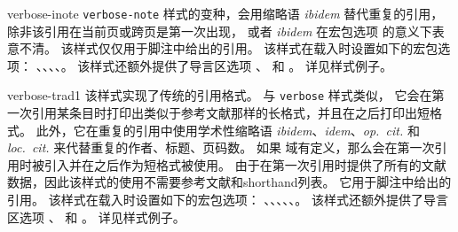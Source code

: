 \begin{marglist}
\item[verbose-inote]
\texttt{verbose-note} 样式的变种，会用缩略语 \emph{ibidem} 替代重复的引用，
除非该引用在当前页或跨页是第一次出现，
或者 \emph{ibidem} 在宏包选项  的意义下表意不清。
该样式仅仅用于脚注中给出的引用。
该样式在载入时设置如下的宏包选项：
、、、、。
该样式还额外提供了导言区选项 、 和 。
详见样式例子。

\item[verbose-trad1]
该样式实现了传统的引用格式。
与 \texttt{verbose} 样式类似，
它会在第一次引用某条目时打印出类似于参考文献那样的长格式，并且在之后打印出短格式。
此外，它在重复的引用中使用学术性缩略语 \emph{ibidem}、\emph{idem}、\emph{op.~cit.} 和 \emph{loc.~cit.} 来代替重复的作者、标题、页码数。
如果  域有定义，那么会在第一次引用时被引入并在之后作为短格式被使用。
由于在第一次引用时提供了所有的文献数据，因此该样式的使用不需要参考文献和shorthand列表。
它用于脚注中给出的引用。
该样式在载入时设置如下的宏包选项：
、、、、、。
该样式还额外提供了导言区选项 、 和 。
详见样式例子。


\end{marglist}
